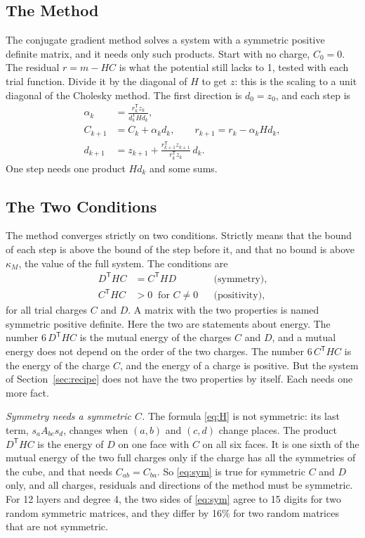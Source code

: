 \documentclass[journal]{IEEEtran}
\newcommand{\T}{\mathsf T}
\begin{document}
\subsection{The Method}
The conjugate gradient method \cite{hestenes} solves a system with a symmetric positive definite matrix, and it needs only such products. Start with no charge, $C_0 = 0$. The residual $r = m - HC$ is what the potential still lacks to 1, tested with each trial function. Divide it by the diagonal of $H$ to get $z$: this is the scaling to a unit diagonal of the Cholesky method. The first direction is $d_0 = z_0$, and each step is
\begin{align}
\alpha_k &= \frac{r_k^{\T} z_k}{d_k^{\T} H d_k}, \\
C_{k+1} &= C_k + \alpha_k d_k, \qquad r_{k+1} = r_k - \alpha_k H d_k, \\
d_{k+1} &= z_{k+1} + \frac{r_{k+1}^{\T} z_{k+1}}{r_k^{\T} z_k}\, d_k .
\end{align}
One step needs one product $Hd_k$ and some sums.

\subsection{The Two Conditions}
The method converges strictly on two conditions. Strictly means that the bound of each step is above the bound of the step before it, and that no bound is above $\kappa_M$, the value of the full system. The conditions are
\begin{align}
D^{\T} H C &= C^{\T} H D && \text{(symmetry)}, \label{eq:sym}\\
C^{\T} H C &> 0 \ \text{ for } C \ne 0 && \text{(positivity)}, \label{eq:pos}
\end{align}
for all trial charges $C$ and $D$. A matrix with the two properties is named symmetric positive definite. Here the two are statements about energy. The number $6\,D^{\T} H C$ is the mutual energy of the charges $C$ and $D$, and a mutual energy does not depend on the order of the two charges. The number $6\,C^{\T} H C$ is the energy of the charge $C$, and the energy of a charge is positive. But the system of Section~\ref{sec:recipe} does not have the two properties by itself. Each needs one more fact.

\emph{Symmetry needs a symmetric $C$.} The formula \eqref{eq:H} is not symmetric: its last term, $s_a A_{bc} s_d$, changes when $(a,b)$ and $(c,d)$ change places. The product $D^{\T}HC$ is the energy of $D$ on one face with $C$ on all six faces. It is one sixth of the mutual energy of the two full charges only if the charge has all the symmetries of the cube, and that needs $C_{ab} = C_{ba}$. So \eqref{eq:sym} is true for symmetric $C$ and $D$ only, and all charges, residuals and directions of the method must be symmetric. For 12 layers and degree 4, the two sides of \eqref{eq:sym} agree to 15 digits for two random symmetric matrices, and they differ by 16\% for two random matrices that are not symmetric.
\end{document}
